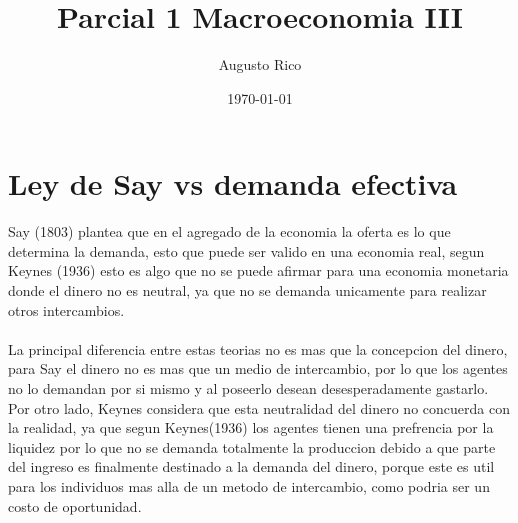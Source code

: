 \documentclass[11pt,letterpaper]{article}
\title{\textbf{Parcial 1 Macroeconomia III}}
\author{Augusto Rico}
\date{\today}
\begin{document}
\maketitle

\section{Ley de Say vs demanda efectiva}
\begin{flushleft}
    Say (1803) plantea que en el agregado de la economia la oferta es lo que determina la demanda, esto que puede ser valido en una economia real, 
    segun Keynes (1936) esto es algo que no se puede afirmar para una economia monetaria donde el dinero no es neutral, ya que no se demanda unicamente para realizar otros intercambios.\\
    ~\\
    La principal diferencia entre estas teorias no es mas que la concepcion del dinero, para Say el dinero no es mas que un medio de intercambio, 
    por lo que los agentes no lo demandan por si mismo y al poseerlo desean desesperadamente gastarlo. Por otro lado, Keynes considera que esta neutralidad del dinero no concuerda con la realidad, 
    ya que segun Keynes(1936) los agentes tienen una prefrencia por la liquidez por lo que no se demanda totalmente la produccion debido a que parte del ingreso es finalmente destinado a la demanda del dinero, porque este es util para los individuos mas alla de un metodo de intercambio, como podria ser un costo de oportunidad.\\
    ~\\
    

\end{flushleft}
    
\end{document}
